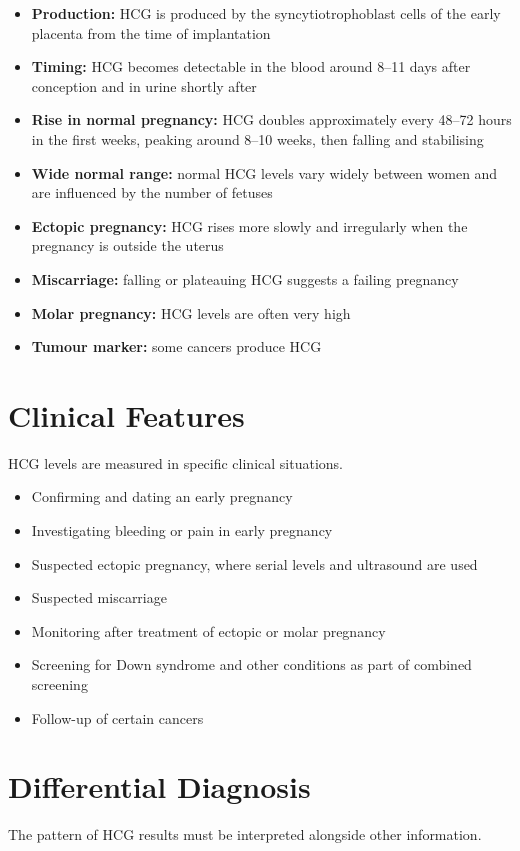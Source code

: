 \begin{itemize}
    \item \textbf{Production:} HCG is produced by the syncytiotrophoblast cells of the early placenta from the time of implantation
    \item \textbf{Timing:} HCG becomes detectable in the blood around 8--11 days after conception and in urine shortly after
    \item \textbf{Rise in normal pregnancy:} HCG doubles approximately every 48--72 hours in the first weeks, peaking around 8--10 weeks, then falling and stabilising
    \item \textbf{Wide normal range:} normal HCG levels vary widely between women and are influenced by the number of fetuses
    \item \textbf{Ectopic pregnancy:} HCG rises more slowly and irregularly when the pregnancy is outside the uterus
    \item \textbf{Miscarriage:} falling or plateauing HCG suggests a failing pregnancy
    \item \textbf{Molar pregnancy:} HCG levels are often very high
    \item \textbf{Tumour marker:} some cancers produce HCG
\end{itemize}

\section*{Clinical Features}
HCG levels are measured in specific clinical situations.

\begin{itemize}
    \item Confirming and dating an early pregnancy
    \item Investigating bleeding or pain in early pregnancy
    \item Suspected ectopic pregnancy, where serial levels and ultrasound are used
    \item Suspected miscarriage
    \item Monitoring after treatment of ectopic or molar pregnancy
    \item Screening for Down syndrome and other conditions as part of combined screening
    \item Follow-up of certain cancers
\end{itemize}

\section*{Differential Diagnosis}
The pattern of HCG results must be interpreted alongside other information.


